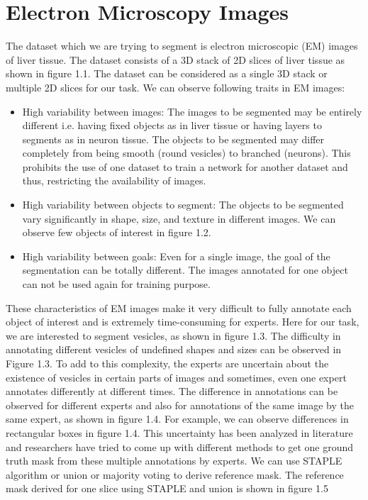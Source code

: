 \section{Electron Microscopy Images}
The dataset which we are trying to segment is electron microscopic (EM) images of liver tissue. The dataset consists of a 3D stack of 2D slices of liver tissue as shown in figure 1.1. The dataset can be considered as a single 3D stack or multiple 2D slices for our task. We can observe following traits in EM images:
\begin{itemize}
\item High variability between images: The images to be segmented may be entirely different i.e. having fixed objects as in liver tissue or having layers to segments as in neuron tissue. The objects to be segmented may differ completely from being smooth (round vesicles) to branched (neurons). This prohibits the use of one dataset to train a network for another dataset and thus, restricting the availability of images.
\item High variability between objects to segment: The objects to be segmented vary significantly in shape, size, and texture in different images. We can observe few objects of interest in figure 1.2.
\item High variability between goals: Even for a single image, the goal of the segmentation can be totally different. The images annotated for one object can not be used again for training purpose.
\end{itemize}
These characteristics of EM images make it very difficult to fully annotate each object of interest and is extremely time-consuming for experts. Here for our task, we are interested to segment vesicles, as shown in figure 1.3. The difficulty in annotating different vesicles of undefined shapes and sizes can be observed in Figure 1.3. To add to this complexity, the experts are uncertain about the existence of vesicles in certain parts of images and sometimes, even one expert annotates differently at different times. The difference in annotations can be observed for different experts and also for annotations of the same image by the same expert, as shown in figure 1.4. For example, we can observe differences in rectangular boxes in figure 1.4. This uncertainty has been analyzed in literature and researchers have tried to come up with different methods to get one ground truth mask from these multiple annotations by experts. We can use STAPLE \cite{staple} algorithm or union or majority voting to derive reference mask. The reference mask derived for one slice using STAPLE and union is shown in figure 1.5\par



